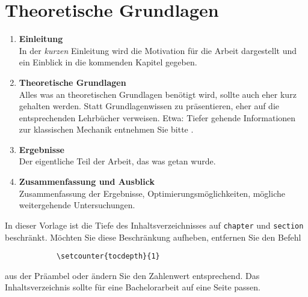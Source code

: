 \chapter{Theoretische Grundlagen}
\begin{enumerate}
    \item \textbf{Einleitung}\\
        In der \emph{kurzen} Einleitung wird die Motivation für die Arbeit
        dargestellt und ein Einblick in die kommenden Kapitel gegeben.
    \item \textbf{Theoretische Grundlagen}\\
        Alles was an theoretischen Grundlagen benötigt wird, sollte auch eher kurz gehalten werden.
        Statt Grundlagenwissen zu präsentieren, eher auf die entsprechenden Lehrbücher verweisen.
        Etwa: Tiefer gehende Informationen zur klassischen Mechanik entnehmen Sie bitte \cite{kuypers}.
    \item \textbf{Ergebnisse} \\
        Der eigentliche Teil der Arbeit, das was getan wurde.
    \item \textbf{Zusammenfassung und Ausblick} \\
        Zusammenfassung der Ergebnisse, Optimierungsmöglichkeiten, mögliche weitergehende Untersuchungen.
\end{enumerate}
In dieser Vorlage ist die Tiefe des Inhaltsverzeichnisses auf \texttt{chapter} und \texttt{section} beschränkt. Möchten Sie diese Beschränkung aufheben, entfernen Sie den Befehl
\begin{verbatim}
            \setcounter{tocdepth}{1}
\end{verbatim}
aus der Präambel oder ändern Sie den Zahlenwert entsprechend. Das Inhaltsverzeichnis sollte für eine Bachelorarbeit auf eine Seite passen.
